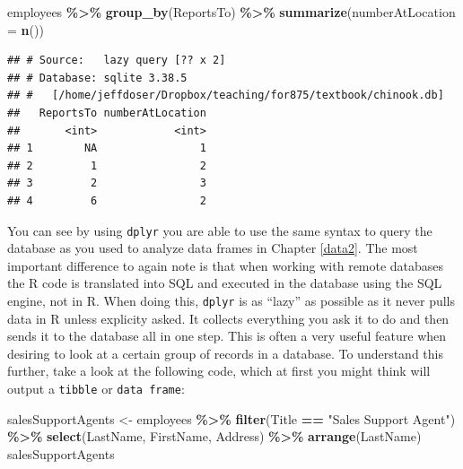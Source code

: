 \documentclass[
]{krantz}
\newenvironment{Shaded}{\begin{snugshade}}{\end{snugshade}}
\newcommand{\DataTypeTok}[1]{\textcolor[rgb]{0.13,0.29,0.53}{#1}}
\newcommand{\KeywordTok}[1]{\textcolor[rgb]{0.13,0.29,0.53}{\textbf{#1}}}
\newcommand{\NormalTok}[1]{#1}
\newcommand{\OperatorTok}[1]{\textcolor[rgb]{0.81,0.36,0.00}{\textbf{#1}}}
\newcommand{\StringTok}[1]{\textcolor[rgb]{0.31,0.60,0.02}{#1}}
\begin{document}
\begin{Shaded}
\begin{Highlighting}[]
\NormalTok{employees }\OperatorTok{\%\textgreater{}\%}\StringTok{ }
\StringTok{  }\KeywordTok{group\_by}\NormalTok{(ReportsTo) }\OperatorTok{\%\textgreater{}\%}\StringTok{ }
\StringTok{  }\KeywordTok{summarize}\NormalTok{(}\DataTypeTok{numberAtLocation =} \KeywordTok{n}\NormalTok{())}
\end{Highlighting}
\end{Shaded}

\begin{verbatim}
## # Source:   lazy query [?? x 2]
## # Database: sqlite 3.38.5
## #   [/home/jeffdoser/Dropbox/teaching/for875/textbook/chinook.db]
##   ReportsTo numberAtLocation
##       <int>            <int>
## 1        NA                1
## 2         1                2
## 3         2                3
## 4         6                2
\end{verbatim}

You can see by using \texttt{dplyr} you are able to use the same syntax to query the database as you used to analyze data frames in Chapter \ref{data2}. The most important difference to again note is that when working with remote databases the R code is translated into SQL and executed in the database using the SQL engine, not in R. When doing this, \texttt{dplyr} is as ``lazy'' as possible as it never pulls data in R unless explicity asked. It collects everything you ask it to do and then sends it to the database all in one step. This is often a very useful feature when desiring to look at a certain group of records in a database. To understand this further, take a look at the following code, which at first you might think will output a \texttt{tibble} or \texttt{data\ frame}:

\begin{Shaded}
\begin{Highlighting}[]
\NormalTok{salesSupportAgents \textless{}{-}}\StringTok{ }\NormalTok{employees }\OperatorTok{\%\textgreater{}\%}\StringTok{ }
\StringTok{  }\KeywordTok{filter}\NormalTok{(Title }\OperatorTok{==}\StringTok{ "Sales Support Agent"}\NormalTok{) }\OperatorTok{\%\textgreater{}\%}\StringTok{ }
\StringTok{  }\KeywordTok{select}\NormalTok{(LastName, FirstName, Address) }\OperatorTok{\%\textgreater{}\%}\StringTok{ }
\StringTok{  }\KeywordTok{arrange}\NormalTok{(LastName) }
\NormalTok{salesSupportAgents}
\end{Highlighting}
\end{Shaded}
\end{document}
